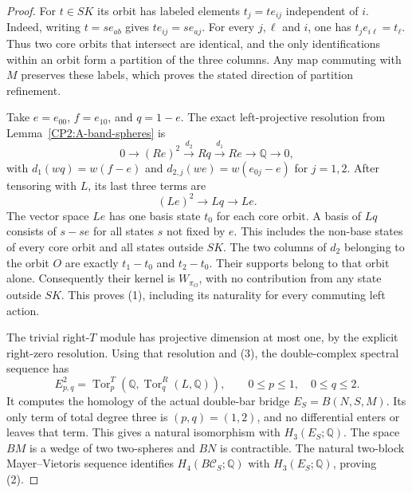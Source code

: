 \begin{proof}
For $t\in SK$ its orbit has labeled elements
$t_j=te_{ij}$ independent of $i$.  Indeed, writing
$t=se_{ab}$ gives $te_{ij}=se_{aj}$.
For every $j,\ell$ and $i$, one has
$t_je_{i\ell}=t_\ell$.  Thus two core orbits that
intersect are identical, and the only identifications
within an orbit form a partition of the three columns.
Any map commuting with $M$ preserves these labels,
which proves the stated direction of partition refinement.

Take $e=e_{00}$, $f=e_{10}$, and $q=1-e$.
The exact left-projective resolution from
Lemma~\ref{CP2:A-band-spheres} is
\[
 0\longrightarrow (Re)^2\xrightarrow{d_2}Rq
  \xrightarrow{d_1}Re\longrightarrow\mathbb Q
  \longrightarrow0,
\]
with $d_1(wq)=w(f-e)$ and
$d_{2,j}(we)=w(e_{0j}-e)$ for $j=1,2$.
After tensoring with $L$, its last three terms are
\[
 (Le)^2\longrightarrow Lq\longrightarrow Le.
                                                               \tag{3}
\]
The vector space $Le$ has one basis state $t_0$ for
each core orbit.  A basis of $Lq$ consists of
$s-se$ for all states $s$ not fixed by $e$.
This includes the non-base states of every core orbit
and all states outside $SK$.
The two columns of $d_2$ belonging to the orbit $O$
are exactly $t_1-t_0$ and $t_2-t_0$.
Their supports belong to that orbit alone.
Consequently their kernel is $W_{\pi_O}$, with no
contribution from any state outside $SK$.
This proves (1), including its naturality for every
commuting left action.

The trivial right-$T$ module has projective dimension
at most one, by the explicit right-zero resolution.
Using that resolution and (3), the double-complex
spectral sequence has
\[
 E^2_{p,q}=\operatorname{Tor}^{T}_p
       (\mathbb Q,\operatorname{Tor}^{R}_q(L,\mathbb Q)),
 \qquad 0\le p\le1,\quad 0\le q\le2.
\]
It computes the homology of the actual double-bar bridge
$E_S=B(N,S,M)$.  Its only term of total degree three
is $(p,q)=(1,2)$, and no differential enters or leaves
that term.  This gives a natural isomorphism with
$H_3(E_S;\mathbb Q)$.
The space $BM$ is a wedge of two two-spheres and $BN$
is contractible.  The natural two-block
Mayer--Vietoris sequence identifies
$H_4(B\mathcal C_S;\mathbb Q)$ with $H_3(E_S;\mathbb Q)$,
proving (2).
\end{proof}

